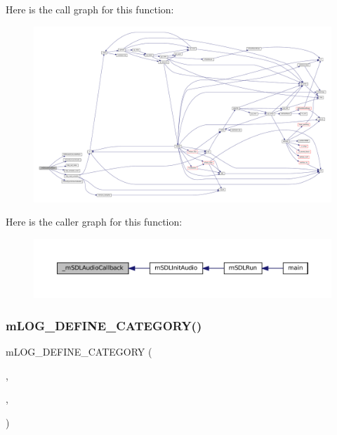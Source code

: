 Here is the call graph for this function\+:
\nopagebreak
\begin{figure}[H]
\begin{center}
\leavevmode
\includegraphics[width=350pt]{sdl-audio_8c_a1ab36538916d6aebaea28162cb4e35a4_cgraph}
\end{center}
\end{figure}
Here is the caller graph for this function\+:
\nopagebreak
\begin{figure}[H]
\begin{center}
\leavevmode
\includegraphics[width=350pt]{sdl-audio_8c_a1ab36538916d6aebaea28162cb4e35a4_icgraph}
\end{center}
\end{figure}
\mbox{\label{sdl-audio_8c_a0cb1f00b3f80d1efe5dd621df6aa101e}} 
\subsubsection{\texorpdfstring{m\+L\+O\+G\+\_\+\+D\+E\+F\+I\+N\+E\+\_\+\+C\+A\+T\+E\+G\+O\+R\+Y()}{mLOG\_DEFINE\_CATEGORY()}}
{\footnotesize\ttfamily m\+L\+O\+G\+\_\+\+D\+E\+F\+I\+N\+E\+\_\+\+C\+A\+T\+E\+G\+O\+RY (\begin{DoxyParamCaption}\item[{S\+D\+L\+\_\+\+A\+U\+D\+IO}]{,  }\item[{\char`\"{}S\+DL Audio\char`\"{}}]{,  }\item[{\char`\"{}platform.\+sdl.\+audio\char`\"{}}]{ }\end{DoxyParamCaption})}

